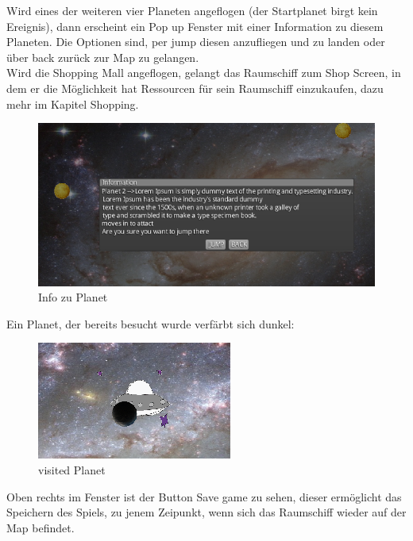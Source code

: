 \documentclass[fontsize=12pt,paper=a4,twoside]{scrartcl}
\begin{document}
Wird eines der weiteren vier Planeten angeflogen (der Startplanet birgt kein Ereignis), dann erscheint ein
Pop up Fenster mit einer Information zu diesem Planeten. Die Optionen sind, per jump diesen anzufliegen und zu landen oder über back zurück zur Map zu gelangen.\\
Wird die Shopping Mall angeflogen, gelangt das Raumschiff zum Shop Screen, in dem er die Möglichkeit hat Ressourcen für sein Raumschiff einzukaufen, dazu mehr im Kapitel Shopping.\\

\begin{figure}[htp]
	\centering
	\includegraphics[width=1.00\linewidth]{pics/infoPlanet2.png} %
	\caption{Info zu Planet}
	\label{fig1}
\end{figure}

Ein Planet, der bereits besucht wurde verfärbt sich dunkel:

\begin{figure}[htp]
	\centering
	\includegraphics[width=0.30\linewidth]{pics/visitedPlanet.png}
	\caption{visited Planet}
	\label{fig1}
\end{figure}

Oben rechts im Fenster ist der Button Save game zu sehen, dieser ermöglicht das Speichern des Spiels, zu jenem Zeipunkt, wenn sich das Raumschiff wieder auf der Map befindet.

\end{document}

